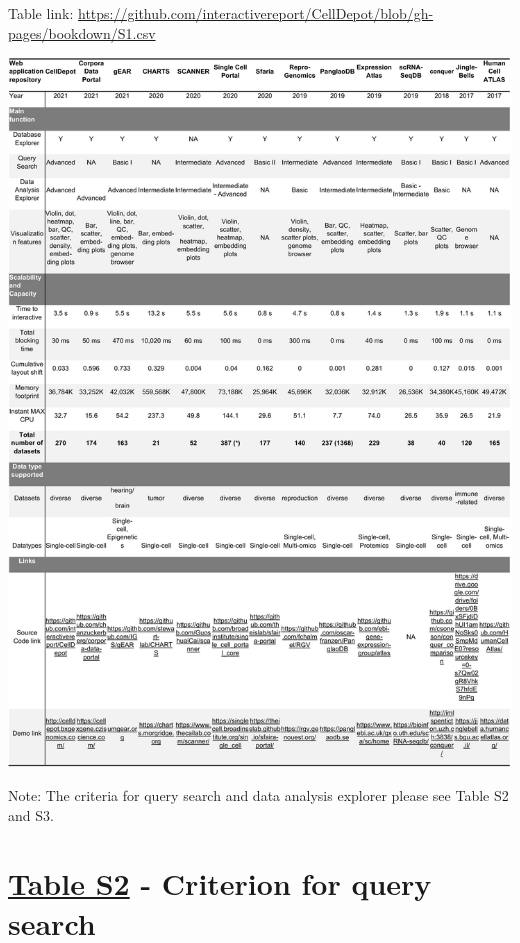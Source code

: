 \documentclass[
  openany]{book}
\begin{document}
Table link: \url{https://github.com/interactivereport/CellDepot/blob/gh-pages/bookdown/S1.csv}


\href{figures/table_s1.jpg}{\includegraphics{figures/table_s1.jpg}}

Note: The criteria for query search and data analysis explorer please see Table S2 and S3.

\hypertarget{table-s2---criterion-for-query-search}{%
\section*{\texorpdfstring{\href{https://github.com/interactivereport/CellDepot/blob/gh-pages/bookdown/S2.csv}{Table S2} - Criterion for query search}{Table S2 - Criterion for query search}}\label{table-s2---criterion-for-query-search}}
\end{document}
